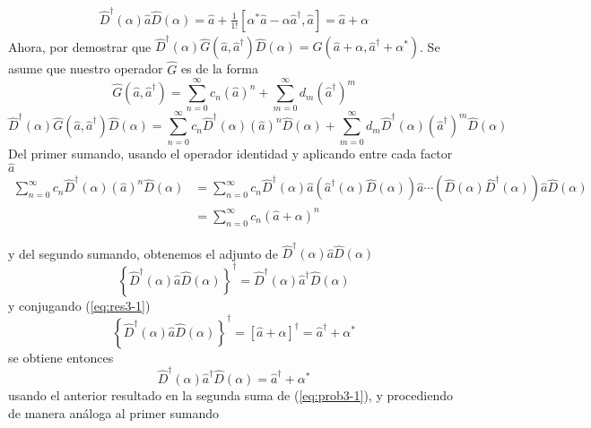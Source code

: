 \begin{enumerate}
\begin{align*}
\hat{D}^{\dagger}(\alpha) \hat{a} \hat{D}(\alpha) = \hat{a} + \frac{1}{1!}[\alpha^{*}\hat{a} - \alpha\hat{a}^{\dagger},\hat{a}] = \hat{a} + \alpha
\end{align*}
Ahora, por demostrar que $\hat{D}^{\dagger}(\alpha) \hat{G}(\hat{a}, \hat{a}^{\dagger}) \hat{D}(\alpha) = \hat{G}(\hat{a} + \alpha, \hat{a}^{\dagger} + \alpha^{*}) $. Se asume que nuestro operador $\hat{G}$ es de la forma
\begin{equation*}
\hat{G}(\hat{a}, \hat{a}^{\dagger}) = \sum_{n=0}^{\infty} c_n (\hat{a})^n + \sum_{m=0}^{\infty} d_m (\hat{a}^{\dagger})^{m}
\end{equation*}
\begin{equation}
\hat{D}^{\dagger}(\alpha)\hat{G}(\hat{a}, \hat{a}^{\dagger})\hat{D}(\alpha) = \sum_{n=0}^{\infty} c_n \hat{D}^{\dagger}(\alpha) (\hat{a})^{n} \hat{D}(\alpha) + \sum_{m=0}^{\infty} d_m \hat{D}^{\dagger}(\alpha) (\hat{a}^{\dagger})^{m} \hat{D}(\alpha) \label{eq:prob3-1}
\end{equation}
Del primer sumando, usando el operador identidad y aplicando entre cada factor $\hat{a}$
\begin{align}
\sum_{n=0}^{\infty} c_n \hat{D}^{\dagger}(\alpha) (\hat{a})^{n} \hat{D}(\alpha) & = \sum_{n=0}^{\infty} c_n \hat{D}^{\dagger}(\alpha)\hat{a} \left( \hat{a}^{\dagger}(\alpha)\hat{D}(\alpha)\right)\hat{a} \cdots \left( \hat{D}(\alpha)\hat{D}^{\dagger}(\alpha) \right)\hat{a} \hat{D}(\alpha) \nonumber \\                                                                
& = \sum_{n=0}^{\infty} c_n (\hat{a} + \alpha)^n \label{eq:res3-1}
\end{align}

y del segundo sumando, obtenemos el adjunto de $\hat{D}^{\dagger}(\alpha)\hat{a} \hat{D}(\alpha)$
\begin{equation}
\left\{ \hat{D}^{\dagger}(\alpha) \hat{a} \hat{D}(\alpha) \right\}^\dagger = \hat{D}^{\dagger}(\alpha) \hat{a}^{\dagger} \hat{D}(\alpha)
\end{equation}
y conjugando (\ref{eq:res3-1})
\begin{equation*}
\left\{ \hat{D}^{\dagger}(\alpha)\hat{a} \hat{D}(\alpha) \right\}^\dagger = [\hat{a} + \alpha]^\dagger = \hat{a}^{\dagger}+\alpha^{*}
\end{equation*}
se obtiene entonces
\begin{equation*}
\hat{D}^{\dagger}(\alpha) \hat{a}^{\dagger} \hat{D}(\alpha) = \hat{a}^{\dagger} + \alpha^{*}
\end{equation*}
usando el anterior resultado en la segunda suma de (\ref{eq:prob3-1}), y procediendo de manera análoga al primer sumando


\end{enumerate}
